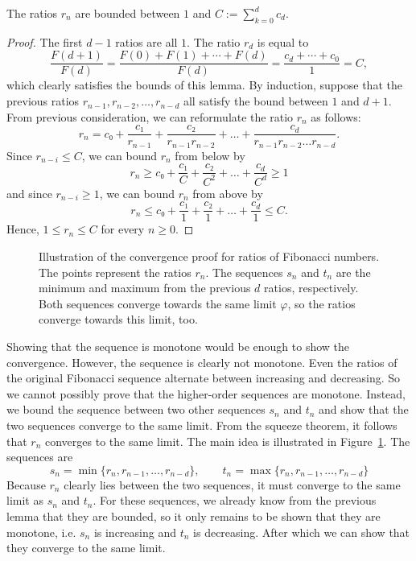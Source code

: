 \begin{lemma}
  \label{lem:fib-bounded}
  The ratios $r_n$ are bounded between $1$ and $C := ∑_{k=0}^d c_d$.
\end{lemma}

\begin{proof}
  The first $d - 1$ ratios are all $1$.
  The ratio $r_d$ is equal to
  \[
    \frac{F(d+1)}{F(d)} = \frac{F(0) + F(1) + ⋯ + F(d)}{F(d)} = \frac{c_d + ⋯ + c_0}{1} = C,
  \]
  which clearly satisfies the bounds of this lemma.
  By induction, suppose that the previous ratios $r_{n-1}, r_{n-2}, …, r_{n-d}$
  all satisfy the bound between $1$ and $d+1$.
  From previous consideration, we can reformulate the ratio $r_n$ as follows:
  \[
    r_n = c₀ + \frac{c₁}{r_{n-1}} + \frac{c₂}{r_{n-1} r_{n-2}} + \dots + \frac{c_d}{r_{n-1} r_{n-2} \dots r_{n-d}}.
  \]
  Since $r_{n-i} ≤ C$, we can bound $r_n$ from below by
  \[
    r_n ≥ c₀ + \frac{c₁}{C} + \frac{c₂}{C^2} + \dots + \frac{c_d}{C^d} ≥ 1
  \]
  and since $r_{n-i} ≥ 1$, we can bound $r_n$ from above by
  \[
    r_n ≤ c₀ + \frac{c₁}{1} + \frac{c₂}{1} + \dots + \frac{c_d}{1} ≤ C.
  \]
  Hence, $1 ≤ r_n ≤ C$ for every $n ≥ 0$.
\end{proof}

\begin{figure}[tbp]
  \centering
  
  \caption{
    Illustration of the convergence proof for ratios of Fibonacci numbers.
    The points represent the ratios $r_n$.
    The sequences $s_n$ and $t_n$ are the minimum and maximum from the previous
    $d$ ratios, respectively.
    Both sequences converge towards the same limit $φ$, so the ratios converge
    towards this limit, too.
  }
  \label{fig:fibonacci-convergence}
\end{figure}

Showing that the sequence is monotone would be enough to show the convergence.
However, the sequence is clearly not monotone.
Even the ratios of the original Fibonacci sequence alternate between increasing
and decreasing.
So we cannot possibly prove that the higher-order sequences are monotone.
Instead, we bound the sequence between two other sequences $s_n$ and $t_n$
and show that the two sequences converge to the same limit.
From the squeeze theorem, it follows that $r_n$ converges to the same limit.
The main idea is illustrated in Figure~\ref{fig:fibonacci-convergence}.
The sequences are
\[
  s_n = \min\{r_n, r_{n-1}, …, r_{n-d} \}, \qquad t_n = \max\{r_n, r_{n-1}, …, r_{n-d}\}
\]
Because $r_n$ clearly lies between the two sequences, it must converge to the same limit as $s_n$ and $t_n$.
For these sequences, we already know from the previous lemma that they are bounded,
so it only remains to be shown that they are monotone,
i.e. $s_n$ is increasing and $t_n$ is decreasing.
After which we can show that they converge to the same limit.

